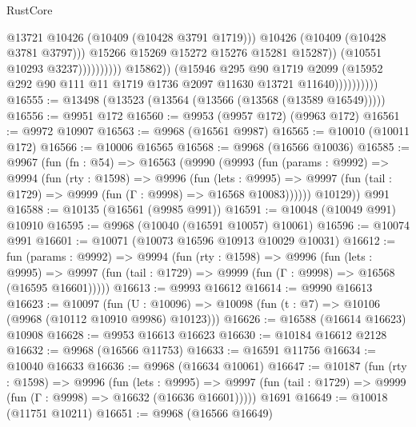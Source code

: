 \begin{lexlean}{RustCore}
\begin{coremodule}
                                                  @13721
                                                  @10426
                                                  (@10409 (@10428 @3791 @1719)))
                                                @10426
                                                (@10409 (@10428 @3781 @3797)))
                                              @15266
                                              @15269
                                              @15272
                                              @15276
                                              @15281
                                              @15287))
                                          (@10551 @10293 @3237))))))))))
                        @15862))
                    (@15946
                      @295
                      @90
                      @1719
                      @2099
                      (@15952 @292 @90 @111 @11 @1719 @1736 @2097 @11630 @13721 @11640))))))))))
@16555 := @13498 (@13523 (@13564 (@13566 (@13568 (@13589 @16549)))))
@16556 := @9951 @172
@16560 := @9953 (@9957 @172) (@9963 @172)
@16561 := @9972 @10907
@16563 := @9968 (@16561 @9987)
@16565 := @10010 (@10011 @172)
@16566 := @10006 @16565
@16568 := @9968 (@16566 @10036)
@16585 := @9967
    (fun (fn : @54) =>
    @16563
      (@9990
        (@9993
          (fun (params : @9992) =>
          @9994
            (fun (rty : @1598) =>
            @9996
              (fun (lets : @9995) =>
              @9997 (fun (tail : @1729) => @9999 (fun (Γ : @9998) => @16568 @10083))))))
        @10129))
    @991
@16588 := @10135 (@16561 (@9985 @991))
@16591 := @10048 (@10049 @991) @10910
@16595 := @9968 (@10040 (@16591 @10057) @10061)
@16596 := @10074 @991
@16601 := @10071 (@10073 @16596 @10913 @10029 @10031)
@16612 := fun (params : @9992) =>
  @9994
    (fun (rty : @1598) =>
    @9996
      (fun (lets : @9995) =>
      @9997 (fun (tail : @1729) => @9999 (fun (Γ : @9998) => @16568 (@16595 @16601)))))
@16613 := @9993 @16612
@16614 := @9990 @16613
@16623 := @10097
    (fun (U : @10096) => @10098 (fun (t : @7) => @10106 (@9968 (@10112 @10910 @9986) @10123)))
@16626 := @16588 (@16614 @16623) @10908
@16628 := @9953 @16613 @16623
@16630 := @10184 @16612 @2128
@16632 := @9968 (@16566 @11753)
@16633 := @16591 @11756
@16634 := @10040 @16633
@16636 := @9968 (@16634 @10061)
@16647 := @10187
    (fun (rty : @1598) =>
    @9996
      (fun (lets : @9995) =>
      @9997 (fun (tail : @1729) => @9999 (fun (Γ : @9998) => @16632 (@16636 @16601)))))
    @1691
@16649 := @10018 (@11751 @10211)
@16651 := @9968 (@16566 @16649)

\end{coremodule}
\end{lexlean}
